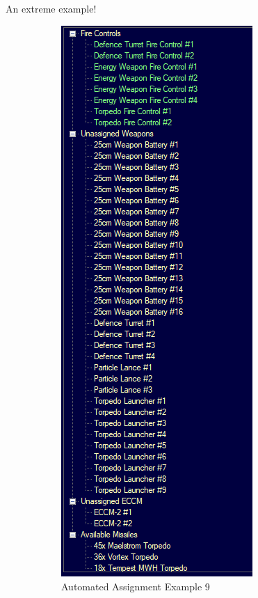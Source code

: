 \documentclass[../Aurora C# unofficial manual.tex]{subfiles}
\begin{document}
	An extreme example!
	\begin{figure}[H]
		\centering
		\begin{subfigure}{.5\textwidth}
			\centering
			\includegraphics[width=0.5\linewidth]{images/AutomatedAssignment9}
			\caption[Automated Assignment]{Automated Assignment Example 9}
			\label{fig:automatedassignment9}
		\end{subfigure}%
		\begin{subfigure}{.5\textwidth}
			\centering

\end{subfigure}
\end{figure}
\end{document}
